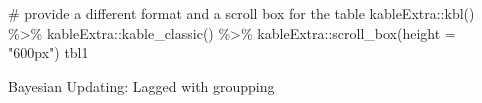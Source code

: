 \documentclass[
  letterpaper,
  DIV=11,
  numbers=noendperiod]{scrreprt}
\newenvironment{Shaded}{\begin{snugshade}}{\end{snugshade}}
\newcommand{\AttributeTok}[1]{\textcolor[rgb]{0.40,0.45,0.13}{#1}}
\newcommand{\CommentTok}[1]{\textcolor[rgb]{0.37,0.37,0.37}{#1}}
\newcommand{\FunctionTok}[1]{\textcolor[rgb]{0.28,0.35,0.67}{#1}}
\newcommand{\InformationTok}[1]{\textcolor[rgb]{0.37,0.37,0.37}{#1}}
\newcommand{\NormalTok}[1]{\textcolor[rgb]{0.00,0.23,0.31}{#1}}
\newcommand{\SpecialCharTok}[1]{\textcolor[rgb]{0.37,0.37,0.37}{#1}}
\newcommand{\StringTok}[1]{\textcolor[rgb]{0.13,0.47,0.30}{#1}}
\begin{document}
\begin{Shaded}
\begin{Highlighting}[]
 \CommentTok{\# provide a different format and a scroll box for the table}
\NormalTok{  kableExtra}\SpecialCharTok{::}\FunctionTok{kbl}\NormalTok{() }\SpecialCharTok{\%\textgreater{}\%}
\NormalTok{  kableExtra}\SpecialCharTok{::}\FunctionTok{kable\_classic}\NormalTok{() }\SpecialCharTok{\%\textgreater{}\%}
\NormalTok{  kableExtra}\SpecialCharTok{::}\FunctionTok{scroll\_box}\NormalTok{(}\AttributeTok{height =} \StringTok{"600px"}\NormalTok{)}
\NormalTok{tbl1}
\InformationTok{\textasciigrave{}\textasciigrave{}\textasciigrave{}}
\end{Highlighting}
\end{Shaded}

\hypertarget{tbl-bayesian-model-learning-anno2-1}{}
\begin{table}
\caption{\label{tbl-bayesian-model-learning-anno2-1}Bayesian Updating: Lagged with groupping }\tabularnewline


\end{table}
\end{document}
